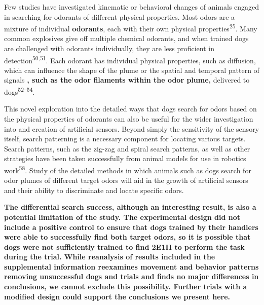 \documentclass[
]{article}
\begin{document}
Few studies have investigated kinematic or behavioral changes of animals engaged in searching for odorants of different physical properties. Most odors are a mixture of individual \textbf{odorants}, each with their own physical properties\textsuperscript{25}. Many common explosives give off multiple chemical odorants, and when trained dogs are challenged with odorants individually, they are less proficient in detection\textsuperscript{50,51}. Each odorant has individual physical properties, such as diffusion, which can influence the shape of the plume or the spatial and temporal pattern of signals \textbf{, such as the odor filaments within the odor plume,} delivered to dogs\textsuperscript{52--54}.

This novel exploration into the detailed ways that dogs search for odors based on the physical properties of odorants can also be useful for the wider investigation into and creation of artificial sensors. Beyond simply the sensitivity of the sensory itself, search patterning is a necessary component for locating various targets. Search patterns, such as the zig-zag and spiral search patterns, as well as other strategies have been taken successfully from animal models for use in robotics work\textsuperscript{58}. Study of the detailed methods in which animals such as dogs search for odor plumes of different target odors will aid in the growth of artificial sensors and their ability to discriminate and locate specific odors.

\textbf{The differential search success, although an interesting result, is also a potential limitation of the study. The experimental design did not include a positive control to ensure that dogs trained by their handlers were able to successfully find both target odors, so it is possible that dogs were not sufficiently trained to find 2E1H to perform the task during the trial. While reanalysis of results included in the supplemental information reexamines movement and behavior patterns removing unsuccessful dogs and trials and finds no major differences in conclusions, we cannot exclude this possibility. Further trials with a modified design could support the conclusions we present here.}
\end{document}
